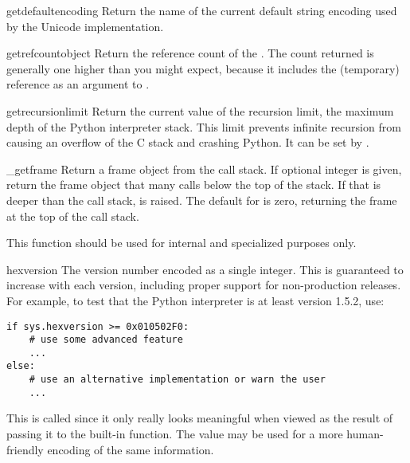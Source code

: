 \begin{funcdesc}{getdefaultencoding}{}
  Return the name of the current default string encoding used by the
  Unicode implementation.
\end{funcdesc}

\begin{funcdesc}{getrefcount}{object}
Return the reference count of the .  The count returned is
generally one higher than you might expect, because it includes the
(temporary) reference as an argument to .
\end{funcdesc}

\begin{funcdesc}{getrecursionlimit}{}
Return the current value of the recursion limit, the maximum depth of
the Python interpreter stack.  This limit prevents infinite recursion
from causing an overflow of the C stack and crashing Python.  It can
be set by .
\end{funcdesc}

\begin{funcdesc}{_getframe}{}
Return a frame object from the call stack.  If optional integer
 is given, return the frame object that many calls below
the top of the stack.  If that is deeper than the call stack,
 is raised.  The default for  is
zero, returning the frame at the top of the call stack.

This function should be used for internal and specialized
purposes only.
\end{funcdesc}

\begin{datadesc}{hexversion}
The version number encoded as a single integer.  This is guaranteed to
increase with each version, including proper support for
non-production releases.  For example, to test that the Python
interpreter is at least version 1.5.2, use:

\begin{verbatim}
if sys.hexversion >= 0x010502F0:
    # use some advanced feature
    ...
else:
    # use an alternative implementation or warn the user
    ...
\end{verbatim}

This is called  since it only really looks meaningful
when viewed as the result of passing it to the built-in
 function.  The  value may be used
for a more human-friendly encoding of the same information.
\end{datadesc}

